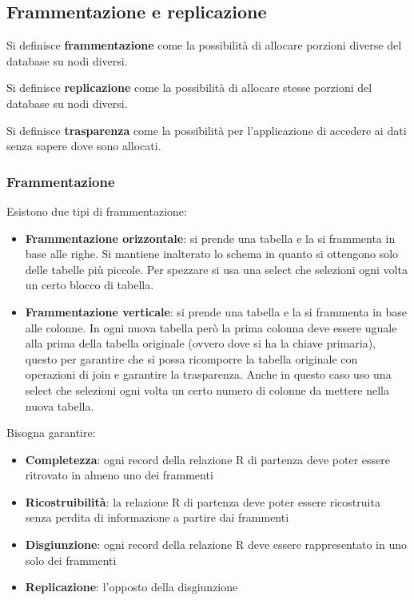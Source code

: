 \subsection{Frammentazione e replicazione}
\begin{definizione}
      Si definisce \textbf{frammentazione} come la possibilità di allocare porzioni
      diverse del database su nodi diversi.
\end{definizione}
\begin{definizione}
      Si definisce \textbf{replicazione} come la possibilità di allocare stesse
      porzioni del database su nodi diversi.
\end{definizione}
\begin{definizione}
      Si definisce \textbf{trasparenza} come la possibilità per l'applicazione di
      accedere ai dati senza sapere dove sono allocati.
\end{definizione}
\subsubsection{Frammentazione}
Esistono due tipi di frammentazione:
\begin{itemize}
      \item \textbf{Frammentazione orizzontale}: si prende una tabella e la si
            frammenta in base alle righe. Si mantiene inalterato lo schema in
            quanto si ottengono solo delle tabelle più piccole. Per spezzare si
            usa una select che selezioni ogni volta un certo blocco di tabella.
      \item \textbf{Frammentazione verticale}: si prende una tabella e la si frammenta
            in base alle colonne. In ogni nuova tabella però la prima colonna
            deve essere uguale alla prima della tabella originale (ovvero dove si
            ha la chiave primaria), questo per garantire che si possa ricomporre
            la tabella originale con operazioni di join e garantire la
            trasparenza. Anche in questo caso uso una select che selezioni ogni
            volta un certo numero di colonne da mettere nella nuova tabella.
\end{itemize}
Bisogna garantire:
\begin{itemize}
      \item \textbf{Completezza}: ogni record della relazione R di partenza
            deve poter essere ritrovato in almeno uno dei frammenti
      \item \textbf{Ricostruibilità}: la relazione R di partenza deve poter essere
            ricostruita senza perdita di informazione a partire dai frammenti
      \item \textbf{Disgiunzione}: ogni record della relazione R deve essere
            rappresentato in uno solo dei frammenti
      \item \textbf{Replicazione}: l'opposto della disgiunzione
\end{itemize}
